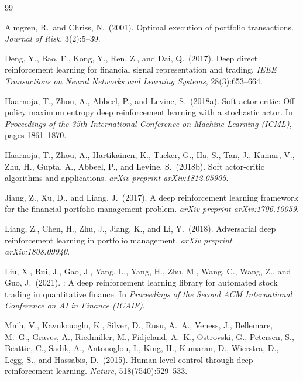 \documentclass[11pt, a4paper]{article}
\begin{document}
\begin{thebibliography}{99}

Almgren, R.\ and Chriss, N.\ (2001).
\newblock Optimal execution of portfolio transactions.
\newblock \textit{Journal of Risk}, 3(2):5--39.

Deng, Y., Bao, F., Kong, Y., Ren, Z., and Dai, Q.\ (2017).
\newblock Deep direct reinforcement learning for financial signal
  representation and trading.
\newblock \textit{IEEE Transactions on Neural Networks and Learning Systems},
  28(3):653--664.

Haarnoja, T., Zhou, A., Abbeel, P., and Levine, S.\ (2018a).
\newblock Soft actor-critic: Off-policy maximum entropy deep reinforcement
  learning with a stochastic actor.
\newblock In \textit{Proceedings of the 35th International Conference on
  Machine Learning (ICML)}, pages 1861--1870.

Haarnoja, T., Zhou, A., Hartikainen, K., Tucker, G., Ha, S., Tan, J.,
  Kumar, V., Zhu, H., Gupta, A., Abbeel, P., and Levine, S.\ (2018b).
\newblock Soft actor-critic algorithms and applications.
\newblock \textit{arXiv preprint arXiv:1812.05905}.

Jiang, Z., Xu, D., and Liang, J.\ (2017).
\newblock A deep reinforcement learning framework for the financial portfolio
  management problem.
\newblock \textit{arXiv preprint arXiv:1706.10059}.

Liang, Z., Chen, H., Zhu, J., Jiang, K., and Li, Y.\ (2018).
\newblock Adversarial deep reinforcement learning in portfolio management.
\newblock \textit{arXiv preprint arXiv:1808.09940}.

Liu, X., Rui, J., Gao, J., Yang, L., Yang, H., Zhu, M., Wang, C., Wang, Z.,
  and Guo, J.\ (2021).
: A deep reinforcement learning library for automated stock
  trading in quantitative finance.
\newblock In \textit{Proceedings of the Second ACM International Conference on
  AI in Finance (ICAIF)}.

Mnih, V., Kavukcuoglu, K., Silver, D., Rusu, A.~A., Veness, J., Bellemare,
  M.~G., Graves, A., Riedmiller, M., Fidjeland, A.~K., Ostrovski, G.,
  Petersen, S., Beattie, C., Sadik, A., Antonoglou, I., King, H., Kumaran, D.,
  Wierstra, D., Legg, S., and Hassabis, D.\ (2015).
\newblock Human-level control through deep reinforcement learning.
\newblock \textit{Nature}, 518(7540):529--533.


\end{thebibliography}
\end{document}
